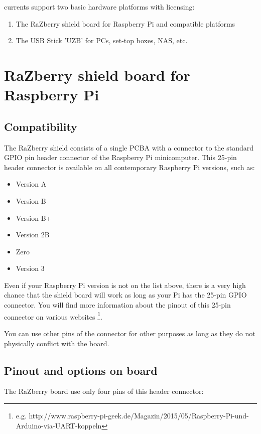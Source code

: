 \zwaveme currents support two basic hardware platforms with \zway licensing:

	\begin{enumerate}
	\item The RaZberry shield board for Raspberry Pi and compatible platforms
	\item The USB Stick 'UZB' for PCs, set-top boxes, NAS, etc.	
	\end{enumerate}
	
\section{RaZberry shield board for Raspberry Pi}

\subsection{Compatibility}

The RaZberry shield consists of a single PCBA with a connector to the standard GPIO pin 
header connector of the Raspberry Pi minicomputer. This 25-pin header connector is 
available on all contemporary Raspberry Pi versions, such as:

\begin{itemize}
\itemsep0em
\item Version A
\item Version B
\item Version B+
\item Version 2B
\item Zero
\item Version 3
\end{itemize}

Even if your Raspberry Pi version is not on the list above, there is a very high chance 
that the shield board will work as long as your Pi has the 25-pin GPIO connector. You will 
find more information about the pinout of this 25-pin connector on various websites
\footnote{e.g. http://www.raspberry-pi-geek.de/Magazin/2015/05/Raspberry-Pi-und-Arduino-via-UART-koppeln}.

You can use other pins of the connector for other purposes as long as they do not 
physically conflict with the board.

\subsection{Pinout and options on board}

The RaZberry board use only four pins of this header connector:

